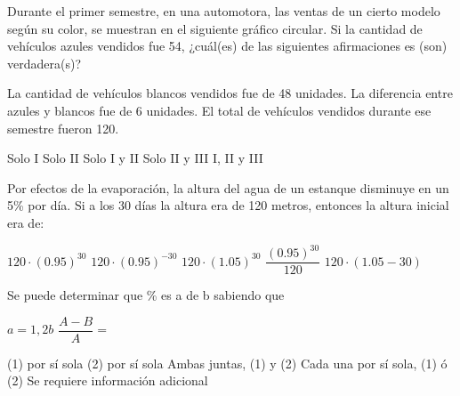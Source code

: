\documentclass[pagina vacia]{srs}
\begin{document}
\begin{preguntas}[after-item-skip=2cm]
\pregunta Durante el primer semestre, en una automotora, las ventas de un cierto modelo según su color, se muestran en el siguiente gráfico circular. Si la cantidad de vehículos azules vendidos fue 54, ¿cuál(es) de las siguientes afirmaciones es (son) verdadera(s)?
\begin{verticali}
\alternativa La cantidad de vehículos blancos vendidos fue de 48 unidades.
\alternativa La diferencia entre azules y blancos fue de 6 unidades.
\alternativa El total de vehículos vendidos durante ese semestre fueron 120.
\end{verticali}
\begin{vertical}
\alternativa Solo I
\alternativa Solo II
\alternativa Solo I y II
\alternativa Solo II y III
\alternativa I, II y III
\end{vertical}

\pregunta Por efectos de la evaporación, la altura del agua de un estanque disminuye en un 5\% por día. Si a los 30 días la altura era de 120 metros, entonces la altura inicial era de:
\begin{vertical}
\alternativa \( 120 \cdot (0.95)^{30} \)
\alternativa \( 120 \cdot (0.95)^{-30} \)
\alternativa \( 120 \cdot (1.05)^{30} \)
\alternativa \( \dfrac{(0.95)^{30}}{120} \)
\alternativa \( 120 \cdot (1.05 - 30) \)
\end{vertical}

\pregunta Se puede determinar que \% es a de b sabiendo que
\begin{verticaln}
\alternativa \( a = 1,2b \)
\alternativa \( \dfrac{A - B}{A} = \)
\end{verticaln}
\begin{vertical}
\alternativa (1) por sí sola
\alternativa (2) por sí sola
\alternativa Ambas juntas, (1) y (2)
\alternativa Cada una por sí sola, (1) ó (2)
\alternativa Se requiere información adicional
\end{vertical}


\end{preguntas}
\end{document}
